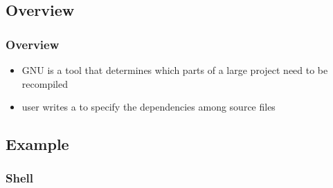 \subsection{Overview}

\begin{frame}
\frametitle{Overview}
\begin{itemize}
\item GNU \make{} is a tool that determines
  which parts of a large project need to be recompiled
\item user writes a  to specify
  the dependencies among source files
\end{itemize}
\end{frame}

\subsection{Example}

\begin{frame}
\frametitle{}

\end{frame}

\begin{frame}
\frametitle{Shell}

\end{frame}

